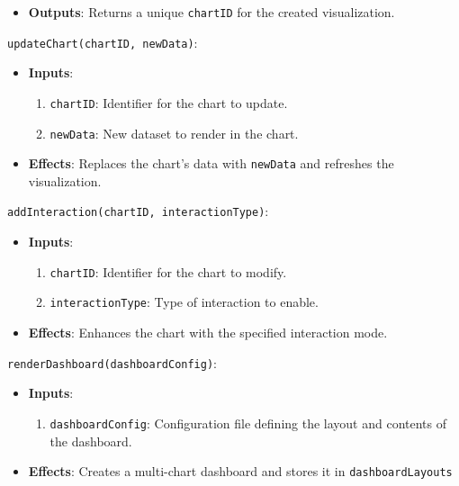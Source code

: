 \documentclass[12pt, titlepage]{article}
\begin{document}
\begin{description}
\begin{description}
\begin{itemize}
    \item \textbf{Outputs}: Returns a unique \texttt{chartID} for the created visualization.
  \end{itemize}

  \item \texttt{updateChart(chartID, newData)}:
  \begin{itemize}
    \item \textbf{Inputs}:
    \begin{enumerate}
      \item \texttt{chartID}: Identifier for the chart to update.
      \item \texttt{newData}: New dataset to render in the chart.
    \end{enumerate}

    \item \textbf{Effects}: Replaces the chart's data with \texttt{newData} and refreshes the 
    visualization.
  \end{itemize}

  \item \texttt{addInteraction(chartID, interactionType)}:
  \begin{itemize}
    \item \textbf{Inputs}:
    \begin{enumerate}
      \item \texttt{chartID}: Identifier for the chart to modify.
      \item \texttt{interactionType}: Type of interaction to enable.
    \end{enumerate}

    \item \textbf{Effects}: Enhances the chart with the specified interaction mode.
  \end{itemize}

  \item \texttt{renderDashboard(dashboardConfig)}:
  \begin{itemize}
    \item \textbf{Inputs}:
    \begin{enumerate}
      \item \texttt{dashboardConfig}: Configuration file defining the layout and contents of 
      the dashboard.
    \end{enumerate}

    \item \textbf{Effects}: Creates a multi-chart dashboard and stores it in \texttt{dashboardLayouts}
  \end{itemize}


\end{description}
\end{description}
\end{document}
